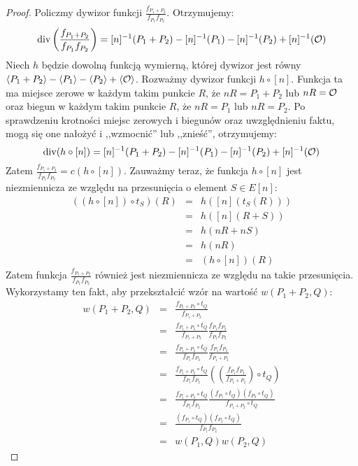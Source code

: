 \begin{proof}
Policzmy dywizor funkcji $\frac{f_{P_1 + P_2}}{f_{P_1}f_{P_2}}$.
Otrzymujemy:
\begin{equation*}
\operatorname{div}\left(\frac{f_{P_1 + P_2}}{f_{P_1}f_{P_2}}\right) =
[n]^{-1}(P_1 + P_2) - [n]^{-1}(P_1) - [n]^{-1}(P_2) + [n]^{-1}(\mathcal{O})
\end{equation*}
Niech $h$ będzie dowolną funkcją wymierną,
której dywizor jest równy
$\left\langle P_1 + P_2\right\rangle - \left\langle P_1\right\rangle - \left\langle P_2\right\rangle + \left\langle\mathcal{O}\right\rangle$.
Rozważmy dywizor funkcji $h \circ [n]$.
Funkcja ta ma miejsce zerowe w każdym takim punkcie $R$,
że $nR = P_1 + P_2$ lub $nR = \mathcal{O}$
oraz biegun w każdym takim punkcie $R$,
że $nR = P_1$ lub $nR = P_2$.
Po sprawdzeniu krotności miejsc zerowych i biegunów
oraz uwzględnieniu faktu,
mogą się one nałożyć i ,,wzmocnić'' lub ,,znieść'',
otrzymujemy:
\begin{equation*}
\operatorname{div}(h \circ [n]) =
[n]^{-1}(P_1 + P_2) - [n]^{-1}(P_1) - [n]^{-1}(P_2) + [n]^{-1}(\mathcal{O})
\end{equation*}
Zatem $\frac{f_{P_1 + P_2}}{f_{P_1}f_{P_2}} = c(h \circ [n])$.
Zauważmy teraz, że funkcja $h \circ [n]$ jest niezmiennicza
ze względu na przesunięcia o element $S \in E[n]$:
\begin{eqnarray*}
((h \circ [n]) \circ t_S)(R)
& = & h([n](t_S(R))) \\
& = & h([n](R + S)) \\
& = & h(nR + nS) \\
& = & h(nR) \\
& = & (h \circ [n])(R)
\end{eqnarray*}
Zatem funkcja $\frac{f_{P_1 + P_2}}{f_{P_1}f_{P_2}}$
również jest niezmiennicza ze względu na takie przesunięcia.
Wykorzystamy ten fakt, aby przekształcić wzór na wartość $w(P_1 + P_2, Q)$:
\begin{eqnarray*}
w(P_1 + P_2, Q)
& = & \frac{f_{P_1 + P_2} \circ t_Q}{f_{P_1 + P_2}} \\
& = & \frac{f_{P_1 + P_2} \circ t_Q}{f_{P_1 + P_2}}
      \frac{f_{P_1}f_{P_2}}{f_{P_1}f_{P_2}} \\
& = & \frac{f_{P_1 + P_2} \circ t_Q}{f_{P_1}f_{P_2}}
      \frac{f_{P_1}f_{P_2}}{f_{P_1 + P_2}} \\
& = & \frac{f_{P_1 + P_2} \circ t_Q}{f_{P_1}f_{P_2}}
      \left(\left(\frac{f_{P_1}f_{P_2}}{f_{P_1 + P_2}}\right) \circ t_Q\right)
      \\
& = & \frac{f_{P_1 + P_2} \circ t_Q}{f_{P_1}f_{P_2}}
      \frac{(f_{P_1} \circ t_Q)(f_{P_2} \circ t_Q)}{f_{P_1 + P_2} \circ t_Q} \\
& = & \frac{(f_{P_1} \circ t_Q)(f_{P_2} \circ t_Q)}{f_{P_1}f_{P_2}} \\
& = & w(P_1, Q)w(P_2, Q)
\end{eqnarray*}
\end{proof}

